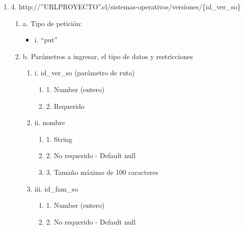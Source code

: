 \begin{enumerate}
    \item 4. http://”URLPROYECTO”.cl/sistemas-operativos/versiones/\{id\_ver\_so\}
    \begin{enumerate}
        \item a. Tipo de petición:
            \begin{itemize}
               \item i. “put”
            \end{itemize}
        \item b. Parámetros a ingresar, el tipo de datos y restricciones
            \begin{enumerate}
                \item i. id\_ver\_so (parámetro de ruta)
                    \begin{enumerate}
                        \item 1. Number (entero)
                        \item 2. Requerido
                    \end{enumerate}
                \item ii. nombre
                    \begin{enumerate}
                        \item 1. String
                        \item 2. No requerido - Default null
                        \item 3. Tamaño máximo de 100 caracteres
                    \end{enumerate}
                \item iii. id\_fam\_so
                    \begin{enumerate}
                        \item 1. Number (entero)
                        \item 2. No requerido - Default null
                    \end{enumerate}
            \end{enumerate}
    \end{enumerate}


\end{enumerate}
